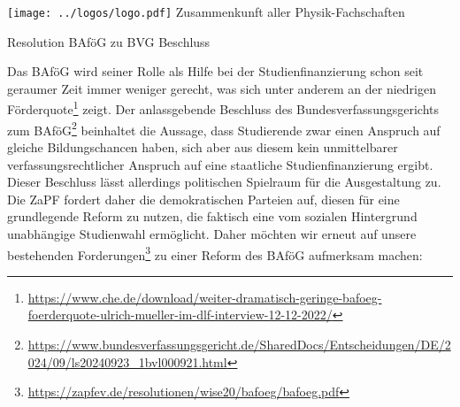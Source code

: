 \documentclass[DIV=calc]{scrartcl}
\begin{document}
\hspace{0.87\textwidth}
\begin{minipage}{120pt}
	\vspace{-1.8cm}
	\texttt{[image: ../logos/logo.pdf]}
	\centering
	\small Zusammenkunft aller Physik-Fachschaften
\end{minipage}

\begin{center}
  \huge{Resolution BAföG zu BVG Beschluss}\vspace{.25\baselineskip}\\
  \normalsize
\end{center}
\vspace{1cm}







Das BAföG wird seiner Rolle als Hilfe bei der Studienfinanzierung schon seit geraumer
Zeit immer weniger gerecht, was sich unter anderem an der niedrigen Förderquote\footnote{\url{https://www.che.de/download/weiter-dramatisch-geringe-bafoeg-foerderquote-ulrich-mueller-im-dlf-interview-12-12-2022/}} zeigt.
Der anlassgebende Beschluss des Bundesverfassungsgerichts zum
BAföG\footnote{\url{https://www.bundesverfassungsgericht.de/SharedDocs/Entscheidungen/DE/2024/09/ls20240923_1bvl000921.html}} beinhaltet die Aussage, dass Studierende zwar einen
Anspruch auf gleiche Bildungschancen haben, sich aber aus diesem kein unmittelbarer
verfassungsrechtlicher Anspruch auf eine staatliche Studienfinanzierung ergibt.
Dieser Beschluss lässt allerdings politischen Spielraum für die Ausgestaltung zu.
Die ZaPF fordert daher die demokratischen Parteien auf, diesen für eine grundlegende
Reform zu nutzen, die faktisch eine vom sozialen Hintergrund unabhängige Studienwahl
ermöglicht.
Daher möchten wir erneut auf unsere bestehenden Forderungen\footnote{\url{https://zapfev.de/resolutionen/wise20/bafoeg/bafoeg.pdf}} zu einer Reform des BAföG aufmerksam machen:
\end{document}
